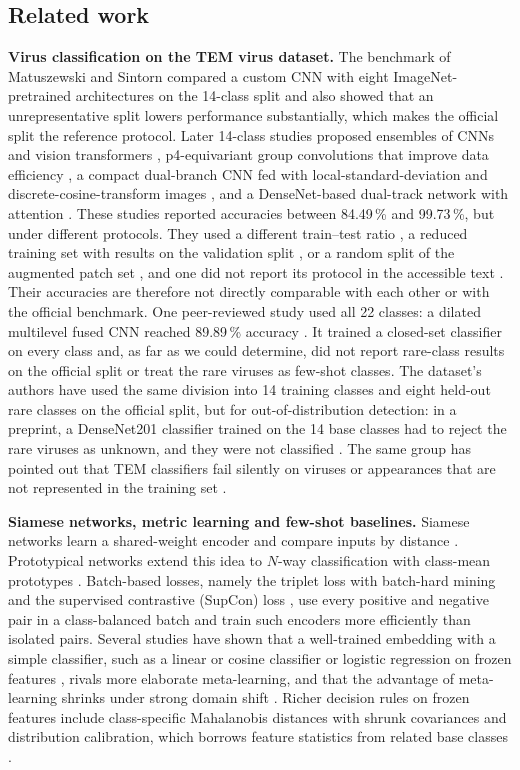 \documentclass[preprint,review,12pt]{elsarticle}
\begin{document}
\subsection{Related work}
\label{sec:related}

\textbf{Virus classification on the TEM virus dataset.} The benchmark of Matuszewski and Sintorn \cite{MS21} compared a custom CNN with eight ImageNet-pretrained architectures on the 14-class split and also showed that an unrepresentative split lowers performance substantially, which makes the official split the reference protocol. Later 14-class studies proposed ensembles of CNNs and vision transformers \cite{N23}, p4-equivariant group convolutions that improve data efficiency \cite{BB24}, a compact dual-branch CNN fed with local-standard-deviation and discrete-cosine-transform images \cite{S24}, and a DenseNet-based dual-track network with attention \cite{B25}. These studies reported accuracies between 84.49\,\% and 99.73\,\%, but under different protocols. They used a different train--test ratio \cite{N23}, a reduced training set with results on the validation split \cite{BB24}, or a random split of the augmented patch set \cite{S24}, and one did not report its protocol in the accessible text \cite{B25}. Their accuracies are therefore not directly comparable with each other or with the official benchmark. One peer-reviewed study used all 22 classes: a dilated multilevel fused CNN reached 89.89\,\% accuracy \cite{U24}. It trained a closed-set classifier on every class and, as far as we could determine, did not report rare-class results on the official split or treat the rare viruses as few-shot classes. The dataset's authors have used the same division into 14 training classes and eight held-out rare classes on the official split, but for out-of-distribution detection: in a preprint, a DenseNet201 classifier trained on the 14 base classes had to reject the rare viruses as unknown, and they were not classified \cite{MS22}. The same group has pointed out that TEM classifiers fail silently on viruses or appearances that are not represented in the training set \cite{Vol26}.

\textbf{Siamese networks, metric learning and few-shot baselines.} Siamese networks learn a shared-weight encoder and compare inputs by distance \cite{Bro93,Koc15}. Prototypical networks extend this idea to $N$-way classification with class-mean prototypes \cite{Sne17}. Batch-based losses, namely the triplet loss with batch-hard mining \cite{Sch15,Luo19} and the supervised contrastive (SupCon) loss \cite{Kho20}, use every positive and negative pair in a class-balanced batch and train such encoders more efficiently than isolated pairs. Several studies have shown that a well-trained embedding with a simple classifier, such as a linear or cosine classifier \cite{Che19} or logistic regression on frozen features \cite{Tia20}, rivals more elaborate meta-learning, and that the advantage of meta-learning shrinks under strong domain shift \cite{Guo20}. Richer decision rules on frozen features include class-specific Mahalanobis distances with shrunk covariances \cite{Bat20} and distribution calibration, which borrows feature statistics from related base classes \cite{Yan21}.
\end{document}
